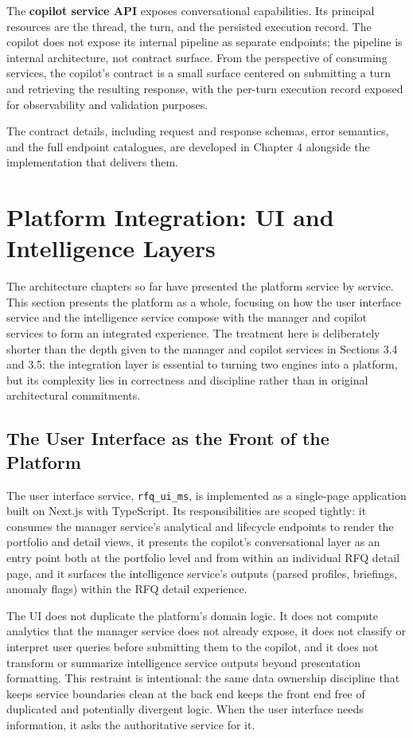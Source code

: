 The \textbf{copilot service API} exposes conversational capabilities. Its principal resources are the thread, the turn, and the persisted execution record. The copilot does not expose its internal pipeline as separate endpoints; the pipeline is internal architecture, not contract surface. From the perspective of consuming services, the copilot's contract is a small surface centered on submitting a turn and retrieving the resulting response, with the per-turn execution record exposed for observability and validation purposes.

The contract details, including request and response schemas, error semantics, and the full endpoint catalogues, are developed in Chapter 4 alongside the implementation that delivers them.

\section{Platform Integration: UI and Intelligence Layers}
The architecture chapters so far have presented the platform service by service. This section presents the platform as a whole, focusing on how the user interface service and the intelligence service compose with the manager and copilot services to form an integrated experience. The treatment here is deliberately shorter than the depth given to the manager and copilot services in Sections 3.4 and 3.5: the integration layer is essential to turning two engines into a platform, but its complexity lies in correctness and discipline rather than in original architectural commitments.

\subsection*{The User Interface as the Front of the Platform}
The user interface service, \texttt{rfq\_ui\_ms}, is implemented as a single-page application built on Next.js with TypeScript. Its responsibilities are scoped tightly: it consumes the manager service's analytical and lifecycle endpoints to render the portfolio and detail views, it presents the copilot's conversational layer as an entry point both at the portfolio level and from within an individual RFQ detail page, and it surfaces the intelligence service's outputs (parsed profiles, briefings, anomaly flags) within the RFQ detail experience.

The UI does not duplicate the platform's domain logic. It does not compute analytics that the manager service does not already expose, it does not classify or interpret user queries before submitting them to the copilot, and it does not transform or summarize intelligence service outputs beyond presentation formatting. This restraint is intentional: the same data ownership discipline that keeps service boundaries clean at the back end keeps the front end free of duplicated and potentially divergent logic. When the user interface needs information, it asks the authoritative service for it.

